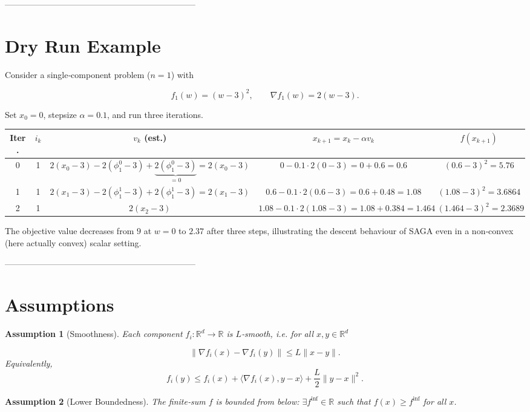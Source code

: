 \documentclass{article}
\newtheorem{assumption}{Assumption}
\newcommand{\R}{\mathbb{R}}
\newcommand{\grad}{\nabla}
\begin{document}
--------------------------------------------------------------------

\section*{Dry Run Example}
Consider a single‑component problem ($n=1$) with  

\[
f_1(w)= (w-3)^2 ,\qquad \grad f_1(w)=2(w-3).
\]

Set $x_0=0$, stepsize $\alpha=0.1$, and run three iterations.

\begin{center}
\begin{tabular}{c|c|c|c|c}
\textbf{Iter.} & $i_k$ & $v_k$ (est.) & $x_{k+1}=x_k-\alpha v_k$ & $f(x_{k+1})$\\\hline
0 & 1 &
$\displaystyle 2(x_0-3)-2(\phi^0_1-3)+\underbrace{2(\phi^0_1-3)}_{=0}=2(x_0-3)$ &
$0-0.1\cdot 2(0-3)=0+0.6=0.6$ &
$(0.6-3)^2=5.76$\\\hline
1 & 1 &
$2(x_1-3)-2(\phi^1_1-3)+2(\phi^1_1-3)=2(x_1-3)$ &
$0.6-0.1\cdot 2(0.6-3)=0.6+0.48=1.08$ &
$(1.08-3)^2=3.6864$\\\hline
2 & 1 &
$2(x_2-3)$ &
$1.08-0.1\cdot2(1.08-3)=1.08+0.384=1.464$ &
$(1.464-3)^2=2.3689$\\
\end{tabular}
\end{center}

The objective value decreases from $9$ at $w=0$ to $2.37$ after three steps, illustrating the descent behaviour of SAGA even in a non‑convex (here actually convex) scalar setting.

--------------------------------------------------------------------

\section*{Assumptions}
\begin{assumption}[Smoothness]\label{ass:smooth}
Each component $f_i:\R^{d}\to\R$ is $L$‑smooth, i.e. for all $x,y\in\R^{d}$  

\[
\|\grad f_i(x)-\grad f_i(y)\|\le L\|x-y\|.
\tag{4}
\]
Equivalently,
\[
f_i(y)\le f_i(x)+\langle\grad f_i(x),y-x\rangle+\frac{L}{2}\|y-x\|^2 .
\tag{5}
\]
\end{assumption}

\begin{assumption}[Lower Boundedness]\label{ass:lb}
The finite‑sum $f$ is bounded from below: $\exists f^{\inf}\in\R$ such that $f(x)\ge f^{\inf}$ for all $x$.
\end{assumption}
\end{document}
